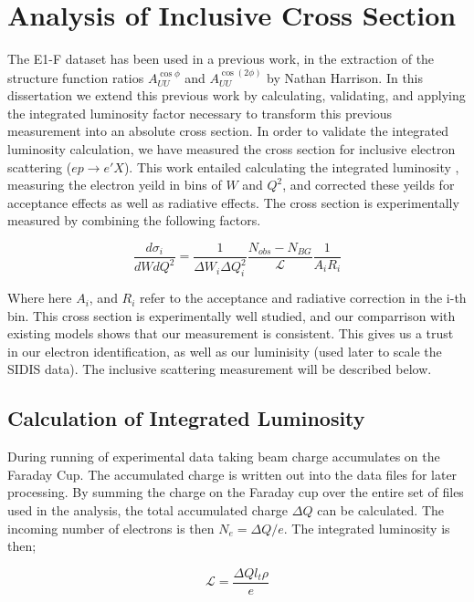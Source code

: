\section{Analysis of Inclusive Cross Section}

The E1-F dataset has been used in a previous work, in the extraction of the structure function ratios $A_{UU}^{\cos\phi}$ and $A_{UU}^{\cos(2\phi)}$ by Nathan Harrison.  In this dissertation we extend this previous work by calculating, validating, and applying the integrated luminosity factor necessary to transform this previous measurement into an absolute cross section.  In order to validate the integrated luminosity calculation, we have measured the cross section for inclusive electron scattering ($ep \rightarrow e'X$).  This work entailed calculating the integrated luminosity \cite{fcup-note}, measuring the electron yeild in bins of $W$ and $Q^2$, and corrected these yeilds for acceptance effects as well as radiative effects.  The cross section is experimentally measured by combining the following factors. 

\begin{equation}
  \frac{d\sigma_i}{dW dQ^2} = \frac{1}{\Delta W_i \Delta Q^2_i} \frac{N_{obs} - N_{BG}}{\mathcal{L}} \frac{1}{A_i R_i}
\end{equation}

Where here $A_i$, and $R_i$ refer to the acceptance and radiative correction in the i-th bin.  This cross section is experimentally well studied, and our comparrison with existing models shows that our measurement is consistent.  This gives us a trust in our electron identification, as well as our luminisity (used later to scale the SIDIS data).  The inclusive scattering measurement will be described below.

\subsection{Calculation of Integrated Luminosity}
During running of experimental data taking beam charge accumulates on the Faraday Cup.  The accumulated charge is written out into the data files for later processing.  By summing the charge on the Faraday cup over the entire set of files used in the analysis, the total accumulated charge $\Delta Q$ can be calculated.  The incoming number of electrons is then $N_e = \Delta Q/e $.  The integrated luminosity is then; 

\begin{equation}
  \mathcal{L} = \frac{\Delta Q l_t \rho}{e}
\end{equation}

